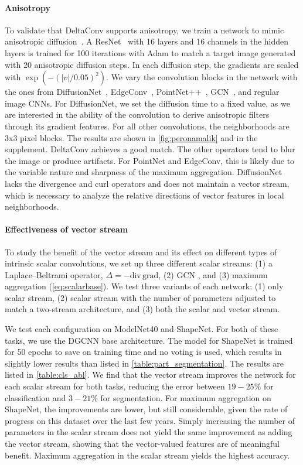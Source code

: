 \documentclass[acmtog, authorversion]{acmart}
\begin{document}
\paragraph*{Anisotropy} To validate that DeltaConv supports anisotropy, we train a network to mimic anisotropic diffusion~\cite{peronamalik}. A ResNet~\cite{he2016deep} with 16 layers and 16 channels in the hidden layers is trained for 100 iterations with Adam \cite{adamkingma} to match a target image generated with 20 anisotropic diffusion steps. In each diffusion step, the gradients are scaled with $\exp(-(|v|/0.05)^2)$. We vary the convolution blocks in the network with the ones from DiffusionNet~\cite{Sharp2020DiffusionIA}, EdgeConv~\cite{Wang2019}, PointNet++~\cite{Qi2017b}, GCN~\cite{kipf2017}, and regular image CNNs. For DiffusionNet, we set the diffusion time to a fixed value, as we are interested in the ability of the convolution to derive anisotropic filters through its gradient features. For all other convolutions, the neighborhoods are 3x3 pixel blocks. The results are shown in \autoref{fig:peronamalik} and in the supplement. DeltaConv achieves a good match. The other operators tend to blur the image or produce artifacts. For PointNet and EdgeConv, this is likely due to the variable nature and sharpness of the maximum aggregation. DiffusionNet lacks the divergence and curl operators and does not maintain a vector stream, which is necessary to analyze the relative directions of vector features in local neighborhoods.

\paragraph*{Effectiveness of vector stream} To study the benefit of the vector stream and its effect on different types of intrinsic scalar convolutions, we set up three different scalar streams: (1) a Laplace--Beltrami operator, $\Delta = -\text{div}\,\text{grad}$, (2) GCN \cite{kipf2017}, and (3) maximum aggregation (\autoref{eq:scalarbase}). We test three variants of each network: (1) only scalar stream, (2) scalar stream with the number of parameters adjusted to match a two-stream architecture, and (3) both the scalar and vector stream.

We test each configuration on ModelNet40 and ShapeNet. For both of these tasks, we use the DGCNN base architecture. The model for ShapeNet is trained for 50 epochs to save on training time and no voting is used, which results in slightly lower results than listed in \autoref{table:part_segmentation}. The results are listed in \autoref{table:cls_abl}. We find that the vector stream improves the network for each scalar stream for both tasks, reducing the error between $19-25\%$ for classification and $3-21\%$ for segmentation. For maximum aggregation on ShapeNet, the improvements are lower, but still considerable, given the rate of progress on this dataset over the last few years. Simply increasing the number of parameters in the scalar stream does not yield the same improvement as adding the vector stream, showing that the vector-valued features are of meaningful benefit. Maximum aggregation in the scalar stream yields the highest accuracy.
\end{document}
